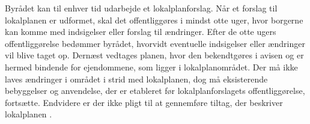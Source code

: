 \newline
Byrådet kan til enhver tid udarbejde et lokalplanforslag. Når et forslag til lokalplanen er udformet, skal det offentliggøres i mindst otte uger, hvor borgerne kan komme med indsigelser eller forslag til ændringer. Efter de otte ugers offentliggørelse bedømmer byrådet, hvorvidt eventuelle indsigelser eller ændringer vil blive taget op. Dernæst vedtages planen, hvor den bekendtgøres i avisen og er hermed bindende for ejendommene, som ligger i lokalplanområdet.
\newline \indent{     }  Der må ikke laves ændringer i området i strid med lokalplanen, dog må eksisterende bebyggelser og anvendelse, der er etableret før lokalplanforslagets offentliggørelse, fortsætte. Endvidere er der ikke pligt til at gennemføre tiltag, der beskriver lokalplanen \citep[ s. 4]{lokalplan}.


